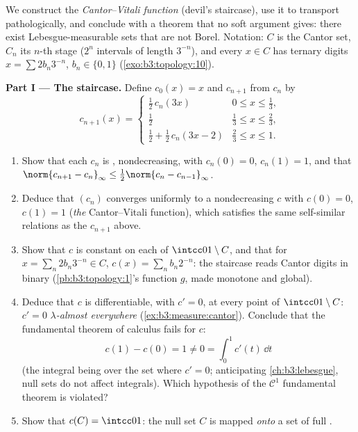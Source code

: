 \begin{problem}
\label{pb:b3:measure:1}
We construct the \emph{Cantor--Vitali function} (devil's
staircase), use it to transport  pathologically, and
conclude with a theorem that no soft argument gives: there
exist Lebesgue-measurable sets that are not Borel. Notation:
$C$ is the Cantor set, $C_n$ its $n$-th stage ($2^n$ intervals
of length $3^{-n}$), and every $x \in C$ has ternary digits
$x = \sum 2b_n3^{-n}$, $b_n \in \{0,1\}$
(\cref{exo:b3:topology:10}).

\medskip
\noindent\textbf{Part I --- The staircase.} Define $c_0(x) = x$
and $c_{n+1}$ from $c_n$ by
\[
c_{n+1}(x) = \begin{cases}
\tfrac12\,c_n(3x) & 0 \leq x \leq \tfrac13,\\[2pt]
\tfrac12 & \tfrac13 \leq x \leq \tfrac23,\\[2pt]
\tfrac12 + \tfrac12\,c_n(3x - 2) & \tfrac23 \leq x \leq 1.
\end{cases}
\]
\begin{enumerate}
  \item Show that each $c_n$ is , nondecreasing, with
        $c_n(0) = 0$, $c_n(1) = 1$, and that
        $\norm{c_{n+1} - c_n}_\infty \leq
        \tfrac12\norm{c_n - c_{n-1}}_\infty$.
  \item Deduce that $(c_n)$ converges uniformly to a 
        nondecreasing $c$ with $c(0) = 0$, $c(1) = 1$
        (\emph{the} Cantor--Vitali function), which satisfies
        the same self-similar relations as the $c_{n+1}$ above.
  \item Show that $c$ is constant on each 
        of $\intcc01\setminus C$, and that for $x = \sum_n
        2b_n3^{-n} \in C$, $c(x) = \sum_n b_n2^{-n}$: the
        staircase reads Cantor digits in binary
        (\cref{pb:b3:topology:1}'s function $g$, made monotone
        and global).
  \item Deduce that $c$ is differentiable, with $c' = 0$, at
        every point of $\intcc01\setminus C$: $c' = 0$
        \emph{$\lambda$-almost everywhere}
        (\cref{ex:b3:measure:cantor}). Conclude that the
        fundamental theorem of calculus fails for $c$:
        \[
        c(1) - c(0) = 1 \neq 0 = \int_0^1 c'(t)\,\dd t
        \]
        (the integral being over the  set where
        $c' = 0$; anticipating \cref{ch:b3:lebesgue}, null sets
        do not affect integrals). Which hypothesis of the
        $\mathcal C^1$ fundamental theorem is violated?
  \item Show that $c(C) = \intcc01$: the null set $C$ is mapped
        \emph{onto} a set of full .
\end{enumerate}


\end{problem}

